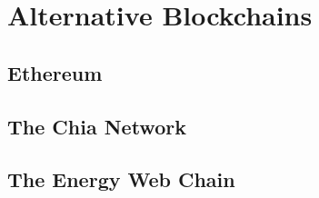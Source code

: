 
\section{Alternative Blockchains}\label{sec:alternative-blockchains}

\subsection{Ethereum}\label{subsec:ethereum}

\subsection{The Chia Network}\label{subsec:chia}

\subsection{The Energy Web Chain}\label{subsec:the-energy-web-chain}